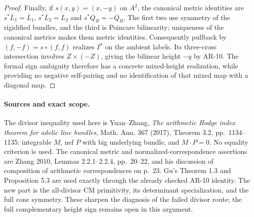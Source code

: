 \begin{proof}
Finally, if $s(x,y)=(x,-y)$ on $A^2$, the canonical metric identities
are $s^*\overline L_1=\overline L_1$,
$s^*\overline L_2=\overline L_2$ and
$s^*\overline Q_B=-\overline Q_B$.  The first two use symmetry of
the rigidified bundles, and the third is Poincare bilinearity;
uniqueness of the canonical metrics makes them metric identities.
Consequently pullback by $(f,-f)=s\circ(f,f)$ realizes $I^\sigma$
on the ambient labels.  Its three-cross intersection involves
$Z\times(-Z)$, giving the bilinear height $-q$ by AR-10.  The
formal sign ambiguity therefore has a concrete mixed-height
realization, while providing no negative self-pairing and no
identification of that mixed map with a diagonal map.
\end{proof}

\paragraph{Sources and exact scope.}
The divisor inequality used here is Yuan--Zhang, \emph{The arithmetic
Hodge index theorem for adelic line bundles}, Math. Ann. 367 (2017),
Theorem 3.2, pp.~1134--1135: integrable $M$, nef $P$ with big
underlying bundle, and $M\cdot P=0$.  No equality criterion is used.
The canonical metric and normalized-correspondence assertions are
Zhang 2010, Lemmas 2.2.1--2.2.4, pp.~20--22, and his discussion of
composition of arithmetic correspondences on p.~23.  Gu's
Theorem 1.3 and Proposition 5.3 are used exactly through the already
checked AR-10 identity.  The new part is the all-divisor CM
primitivity, its determinant specialization, and the full cone
symmetry.  These sharpen the diagnosis of the failed divisor route;
the full complementary height sign remains open in this argument.
